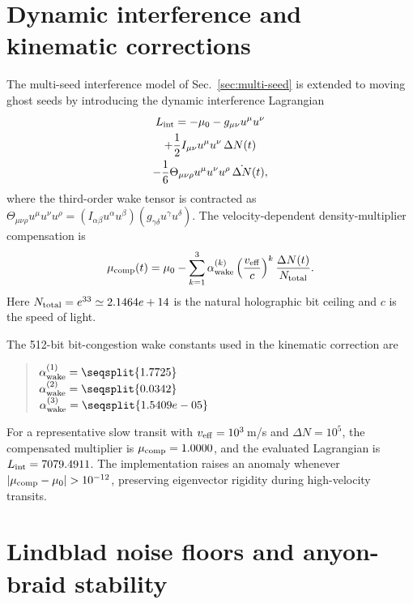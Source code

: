 \documentclass[aps,pra,10pt,onecolumn,superscriptaddress,nofootinbib,longbibliography,floatfix]{revtex4-2}
\begin{document}
\section{Dynamic interference and kinematic corrections}

The multi-seed interference model of Sec.~\ref{sec:multi-seed} is extended to moving ghost seeds by introducing the dynamic interference Lagrangian
%
\begin{multline}
L_{\rm int} = -\mu_0 - g_{\mu\nu}u^\mu u^\nu \\
+ \frac12 I_{\mu\nu}u^\mu u^\nu\,\Delta N(t) \\
- \frac16 \Theta_{\mu\nu\rho}u^\mu u^\nu u^\rho\,\dot{\Delta N}(t),
\end{multline}
%
where the third-order wake tensor is contracted as
$\Theta_{\mu\nu\rho}u^\mu u^\nu u^\rho = (I_{\alpha\beta}u^\alpha u^\beta)(g_{\gamma\delta}u^\gamma u^\delta)$.
The velocity-dependent density-multiplier compensation is
%
\begin{equation}
\mu_{\rm comp}(t) = \mu_0 - \sum_{k=1}^{3}\alpha_{\rm wake}^{(k)}\left(\frac{v_{\rm eff}}{c}\right)^k \frac{\Delta N(t)}{N_{\rm total}}.
\end{equation}
%
Here $N_{\rm total}=e^{33}\simeq2.1464e+14$ is the natural holographic bit ceiling and $c$ is the speed of light.

The 512-bit bit-congestion wake constants used in the kinematic correction are
\begin{quote}\small
$\alpha_{\rm wake}^{(1)} = \expandafter\seqsplit\expandafter{\ExoticWakeOne{}}$\\
$\alpha_{\rm wake}^{(2)} = \expandafter\seqsplit\expandafter{\ExoticWakeTwo{}}$\\
$\alpha_{\rm wake}^{(3)} = \expandafter\seqsplit\expandafter{\ExoticWakeThree{}}$
\end{quote}

For a representative slow transit with $v_{\rm eff}=10^3\,$m/s and $\Delta N=10^5$, the compensated multiplier is $\mu_{\rm comp}=1.0000$, and the evaluated Lagrangian is $L_{\rm int}=7079.4911$.
The implementation raises an anomaly whenever $|\mu_{\rm comp}-\mu_0|>10^{-12}$, preserving eigenvector rigidity during high-velocity transits.

\FloatBarrier
\section{Lindblad noise floors and anyon-braid stability}
\end{document}
